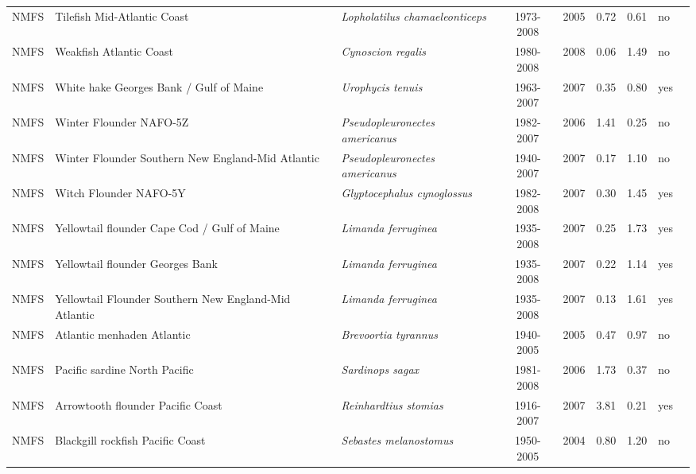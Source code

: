 \begin{longtable}{p{1.8cm}p{4cm}p{4cm}ccccp{1.9cm}c}
  NMFS & Tilefish Mid-Atlantic Coast & \textit{Lopholatilus chamaeleonticeps} & 1973-2008 & 2005 & 0.72 & 0.61 & no & \cite{NEFSC-TILEMATLC-1973-2008-NITSCHKE} \\ 
  NMFS & Weakfish Atlantic Coast & \textit{Cynoscion regalis} & 1980-2008 & 2008 & 0.06 & 1.49 & no & \cite{NEFSC-WEAKFISHATLC-1980-2008-STANTON} \\ 
  NMFS & White hake Georges Bank / Gulf of Maine & \textit{Urophycis tenuis} & 1963-2007 & 2007 & 0.35 & 0.80 & yes & \cite{NEFSC-WHAKEGBGOM-1963-2007-SOSEBEE} \\ 
  NMFS & Winter Flounder NAFO-5Z & \textit{Pseudopleuronectes americanus} & 1982-2007 & 2006 & 1.41 & 0.25 & no & \cite{NEFSC-WINFLOUN5Z-1982-2007-HENDRICKSON} \\ 
  NMFS & Winter Flounder Southern New England-Mid Atlantic & \textit{Pseudopleuronectes americanus} & 1940-2007 & 2007 & 0.17 & 1.10 & no & \cite{NEFSC-WINFLOUNSNEMATL-1940-2007-TERCEIRO} \\ 
  NMFS & Witch Flounder NAFO-5Y & \textit{Glyptocephalus cynoglossus} & 1982-2008 & 2007 & 0.30 & 1.45 & yes & \cite{NEFSC-WITFLOUN5Y-1982-2008-WIGLEY} \\ 
  NMFS & Yellowtail flounder Cape Cod / Gulf of Maine & \textit{Limanda ferruginea} & 1935-2008 & 2007 & 0.25 & 1.73 & yes & \cite{NEFSC-YELLCCODGOM-1935-2008-LEGAULT} \\ 
  NMFS & Yellowtail flounder Georges Bank & \textit{Limanda ferruginea} & 1935-2008 & 2007 & 0.22 & 1.14 & yes & \cite{NEFSC-YELLGB-1935-2008-BAUM} \\ 
  NMFS & Yellowtail Flounder Southern New England-Mid Atlantic & \textit{Limanda ferruginea} & 1935-2008 & 2007 & 0.13 & 1.61 & yes & \cite{NEFSC-YELLSNEMATL-1935-2008-BAUM} \\ 
  NMFS & Atlantic menhaden Atlantic & \textit{Brevoortia tyrannus} & 1940-2005 & 2005 & 0.47 & 0.97 & no & \cite{NMFS-MENATLAN-1940-2005-STANTON} \\ 
  NMFS & Pacific sardine North Pacific & \textit{Sardinops sagax} & 1981-2008 & 2006 & 1.73 & 0.37 & no & \cite{NMFS-SARDNPAC-1981-2008-STANTON} \\ 
  NMFS & Arrowtooth flounder Pacific Coast & \textit{Reinhardtius stomias} & 1916-2007 & 2007 & 3.81 & 0.21 & yes & \cite{NWFSC-ARFLOUNDPCOAST-1916-2007-BRANCH} \\ 
  NMFS & Blackgill rockfish  Pacific Coast & \textit{Sebastes melanostomus} & 1950-2005 & 2004 & 0.80 & 1.20 & no & \cite{NWFSC-BGROCKPCOAST-1950-2005-STANTON} \\ 

\end{longtable}

